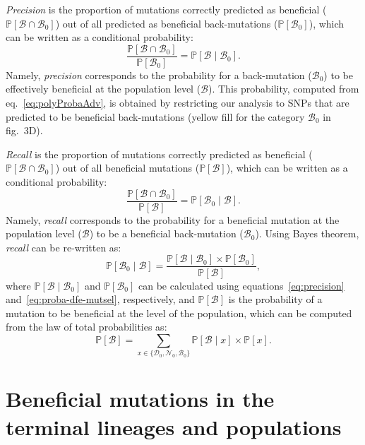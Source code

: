 \documentclass[12pt]{article}
\newcommand{\proba}{\mathbb{P}}
\newcommand{\SphyDel}{\mathcal{D}_0}
\newcommand{\SphyNeu}{\mathcal{N}_0}
\newcommand{\SphyBen}{\mathcal{B}_0}
\newcommand{\Sphyclass}{x}
\newcommand{\given}{\mid}
\newcommand{\SpopBen}{\mathcal{B}}
\newcommand{\ProbaPopBen}{\proba [ \SpopBen ]}
\begin{document}
    \textit{Precision} is the proportion of mutations correctly predicted as beneficial ($\proba [ \SpopBen \cap  \SphyBen]$) out of all predicted as beneficial back-mutations ($\proba [ \SphyBen]$), which can be written as a conditional probability:
    \begin{equation}
        \frac{\proba [ \SpopBen  \cap  \SphyBen]}{\proba [ \SphyBen]} = \proba [ \SpopBen  \given  \SphyBen].
        \label{eq:precision}
    \end{equation}
    Namely, \textit{precision} corresponds to the probability for a back-mutation ($\SphyBen$) to be effectively beneficial at the population level ($\SpopBen$).
    This probability, computed from eq.~\ref{eq:polyProbaAdv}, is obtained by restricting our analysis to SNPs that are predicted to be beneficial back-mutations (yellow fill for the category $\SphyBen$ in fig.~3D).

    \textit{Recall} is the proportion of mutations correctly predicted as beneficial ($\proba [ \SpopBen \cap  \SphyBen]$) out of all beneficial mutations ($\proba [ \SpopBen]$), which can be written as a conditional probability:
    \begin{equation}
        \frac{\proba [ \SpopBen \cap  \SphyBen]}{\proba [ \SpopBen]} = \proba [ \SphyBen  \given \SpopBen ].
    \end{equation}
    Namely, \textit{recall} corresponds to the probability for a beneficial mutation at the population level ($\SpopBen$) to be a beneficial back-mutation ($\SphyBen$).
    Using Bayes theorem, \textit{recall} can be re-written as:
    \begin{equation}
        \proba [\SphyBen \given \SpopBen] = \frac{\proba [\SpopBen \given \SphyBen] \times \proba[\SphyBen]}{\ProbaPopBen},
        \label{eq:bayes}
    \end{equation}
    where $\proba [\SpopBen \given \SphyBen]$ and $\proba [ \SphyBen ]$ can be calculated using equations~\ref{eq:precision} and~\ref{eq:proba-dfe-mutsel}, respectively, and $\proba [ \SpopBen ]$ is the probability of a mutation to be beneficial at the level of the population, which can be computed from the law of total probabilities as:
    \begin{equation}
        \proba [ \SpopBen ] = \sum_{\Sphyclass \in \{\SphyDel, \SphyNeu, \SphyBen \} }\proba [\SpopBen \given \Sphyclass ] \times \proba [\Sphyclass ].
        \label{eq:total_proba}
    \end{equation}

    \section{Beneficial mutations in the terminal lineages and populations}\label{sec:beneficial-mutations}
\end{document}
